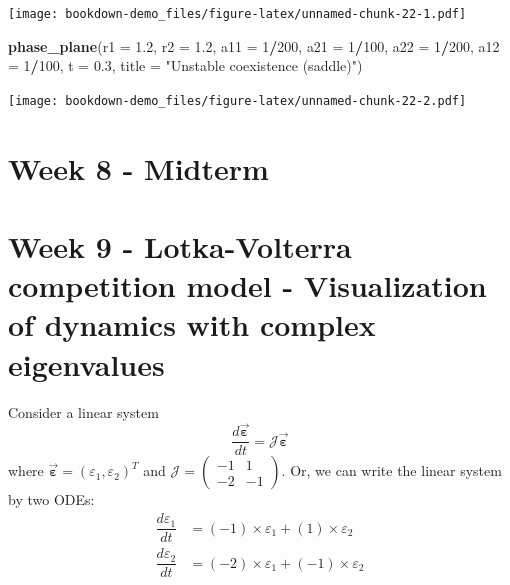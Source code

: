 \documentclass[
]{book}
\newenvironment{Shaded}{\begin{snugshade}}{\end{snugshade}}
\newcommand{\DataTypeTok}[1]{\textcolor[rgb]{0.13,0.29,0.53}{#1}}
\newcommand{\DecValTok}[1]{\textcolor[rgb]{0.00,0.00,0.81}{#1}}
\newcommand{\FloatTok}[1]{\textcolor[rgb]{0.00,0.00,0.81}{#1}}
\newcommand{\KeywordTok}[1]{\textcolor[rgb]{0.13,0.29,0.53}{\textbf{#1}}}
\newcommand{\NormalTok}[1]{#1}
\newcommand{\OperatorTok}[1]{\textcolor[rgb]{0.81,0.36,0.00}{\textbf{#1}}}
\newcommand{\StringTok}[1]{\textcolor[rgb]{0.31,0.60,0.02}{#1}}
\begin{document}
\texttt{[image: bookdown-demo\_files/figure-latex/unnamed-chunk-22-1.pdf]}

\begin{Shaded}
\begin{Highlighting}[]
  \KeywordTok{phase_plane}\NormalTok{(}\DataTypeTok{r1 =} \FloatTok{1.2}\NormalTok{, }\DataTypeTok{r2 =} \FloatTok{1.2}\NormalTok{, }\DataTypeTok{a11 =} \DecValTok{1}\OperatorTok{/}\DecValTok{200}\NormalTok{, }\DataTypeTok{a21 =} \DecValTok{1}\OperatorTok{/}\DecValTok{100}\NormalTok{, }\DataTypeTok{a22 =} \DecValTok{1}\OperatorTok{/}\DecValTok{200}\NormalTok{, }\DataTypeTok{a12 =} \DecValTok{1}\OperatorTok{/}\DecValTok{100}\NormalTok{, }\DataTypeTok{t =} \FloatTok{0.3}\NormalTok{, }\DataTypeTok{title =} \StringTok{"Unstable coexistence (saddle)"}\NormalTok{)}
\end{Highlighting}
\end{Shaded}

\texttt{[image: bookdown-demo\_files/figure-latex/unnamed-chunk-22-2.pdf]}

\hypertarget{week-8---midterm}{%
\chapter*{Week 8 - Midterm}\label{week-8---midterm}}

\hypertarget{week-9---lotka-volterra-competition-model---visualization-of-dynamics-with-complex-eigenvalues}{%
\chapter*{Week 9 - Lotka-Volterra competition model - Visualization of dynamics with complex eigenvalues}\label{week-9---lotka-volterra-competition-model---visualization-of-dynamics-with-complex-eigenvalues}}

Consider a linear system
\[
\dfrac{d \vec{\pmb\varepsilon}}{d t} = \mathcal{J}\vec{\pmb\varepsilon}
\]
where \(\vec{\pmb\varepsilon} = (\varepsilon_1, \varepsilon_2)^T\) and \(\mathcal{J} = \begin{pmatrix} -1 & 1\\ -2 & -1 \end{pmatrix}\).
Or, we can write the linear system by two ODEs:
\begin{align*}
  \dfrac{d \varepsilon_1}{d t} &= (-1)\times \varepsilon_1 + (1)\times\varepsilon_2\\
  \dfrac{d \varepsilon_2}{d t} &= (-2)\times \varepsilon_1 + (-1)\times\varepsilon_2\\
\end{align*}
\end{document}
